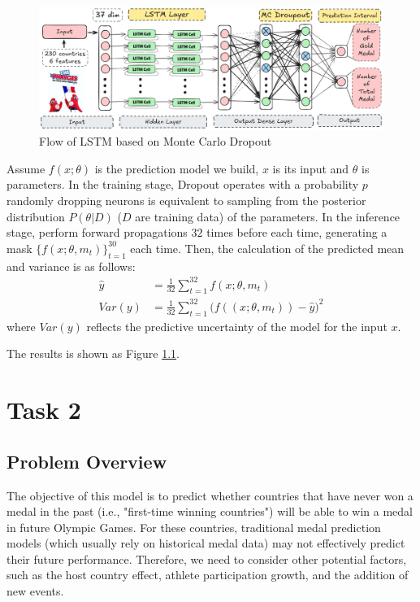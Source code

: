 \documentclass{mcmthesis}
\begin{document}
\begin{figure}
	\centering
	\includegraphics[width=1\linewidth]{fig/LSTM-MCD.png}
	\caption{Flow of LSTM based on Monte Carlo Dropout}
	\label{fig:lstm-mcd}
\end{figure}


Assume $f(x;\theta)$ is the prediction model we build, $x$ is its input and $\theta$ is parameters. In the training stage, Dropout operates with a probability $p$
randomly dropping neurons is equivalent to sampling from the posterior distribution $P(\theta|D)$ ($D$ are training data) of the parameters. In the inference stage, perform forward propagations $32$ times before each time, generating a mask $\{f(x;\theta,m_t)\}_{t=1}^{30}$ each time. Then, the calculation of the predicted mean and variance is as follows:
\begin{align*}
	\hat{y}&=\frac{1}{32} \sum_{t=1}^{32} f(x;\theta,m_t) \\
	Var(y) &=\frac{1}{32} \sum_{t=1}^{32} \big( f((x;\theta,m_t)) - \hat{y} \big)^2
\end{align*}
where $Var(y)$ reflects the predictive uncertainty of the model for the input $x$.

The results is shown as Figure \ref{}.





	
	\section{Task 2}
	
	
	\subsection{Problem Overview}
	The objective of this model is to predict whether countries that have never won a medal in the past (i.e., "first-time winning countries") will be able to win a medal in future Olympic Games. For these countries, traditional medal prediction models (which usually rely on historical medal data) may not effectively predict their future performance. Therefore, we need to consider other potential factors, such as the host country effect, athlete participation growth, and the addition of new events.
	
\end{document}
